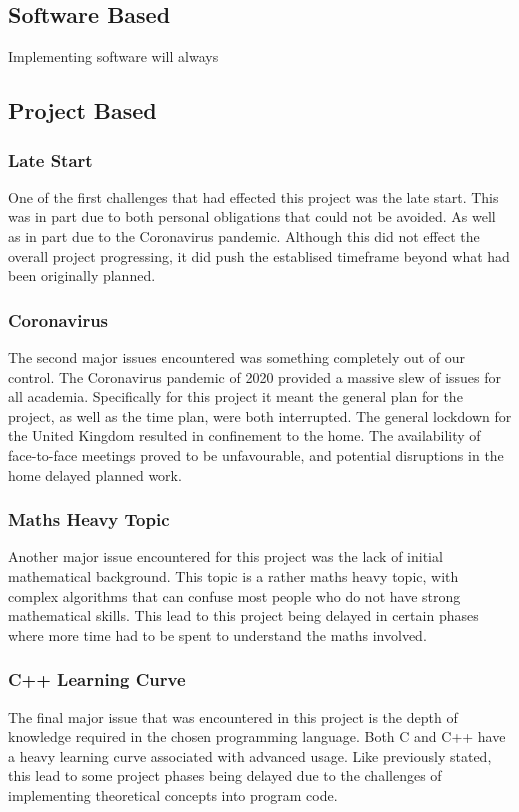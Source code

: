 \documentclass{article}
\begin{document}
\subsection{Software Based}
Implementing software will always

\subsection{Project Based}
\subsubsection{Late Start}
One of the first challenges that had effected this project was the late start. This was in part due to both personal obligations 
that could not be avoided. As well as in part due to the Coronavirus pandemic. Although this did not effect the overall project 
progressing, it did push the establised timeframe beyond what had been originally planned.

\subsubsection{Coronavirus}
The second major issues encountered was something completely out of our control. The Coronavirus
pandemic of 2020 provided a massive slew of issues for all academia. Specifically for this project
it meant the general plan for the project, as well as the time plan, were both interrupted. The
general lockdown for the United Kingdom resulted in confinement to the home. The availability of
face-to-face meetings proved to be unfavourable, and potential disruptions in the home delayed
planned work.

\subsubsection{Maths Heavy Topic}
Another major issue encountered for this project was the lack of initial mathematical background. This topic is a rather maths 
heavy topic, with complex algorithms that can confuse most people who do not have strong mathematical skills. This lead to this 
project being delayed in certain phases where more time had to be spent to understand the maths involved.

\subsubsection{C++ Learning Curve}
The final major issue that was encountered in this project is the depth of knowledge required in the chosen programming language.
Both C and C++ have a heavy learning curve associated with advanced usage. Like previously stated, this lead to some project
phases being delayed due to the challenges of implementing theoretical concepts into program code.
\end{document}
